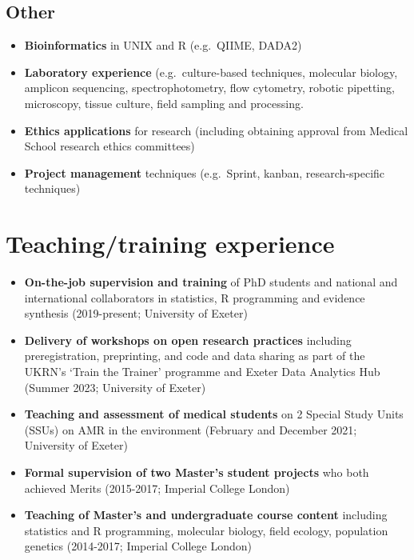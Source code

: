 \documentclass[11pt,a4paper,]{awesome-cv}
\begin{document}
\hypertarget{other}{%
\subsection{Other}\label{other}}

\begin{itemize}
\item
  \textbf{Bioinformatics} in UNIX and R (e.g.~QIIME, DADA2)
\item
  \textbf{Laboratory experience} (e.g.~culture-based techniques,
  molecular biology, amplicon sequencing, spectrophotometry, flow
  cytometry, robotic pipetting, microscopy, tissue culture, field
  sampling and processing.
\item
  \textbf{Ethics applications} for research (including obtaining
  approval from Medical School research ethics committees)
\item
  \textbf{Project management} techniques (e.g.~Sprint, kanban,
  research-specific techniques)
\end{itemize}

\hypertarget{teachingtraining-experience}{%
\section{Teaching/training
experience}\label{teachingtraining-experience}}

\begin{itemize}
\item
  \textbf{On-the-job supervision and training} of PhD students and
  national and international collaborators in statistics, R programming
  and evidence synthesis (2019-present; University of Exeter)
\item
  \textbf{Delivery of workshops on open research practices} including
  preregistration, preprinting, and code and data sharing as part of the
  UKRN's `Train the Trainer' programme and Exeter Data Analytics Hub
  (Summer 2023; University of Exeter)
\item
  \textbf{Teaching and assessment of medical students} on 2 Special
  Study Units (SSUs) on AMR in the environment (February and December
  2021; University of Exeter)
\item
  \textbf{Formal supervision of two Master's student projects} who both
  achieved Merits (2015-2017; Imperial College London)
\item
  \textbf{Teaching of Master's and undergraduate course content}
  including statistics and R programming, molecular biology, field
  ecology, population genetics (2014-2017; Imperial College London)
\end{itemize}
\end{document}
